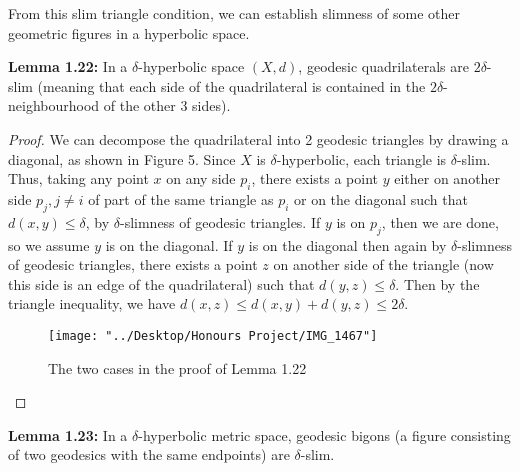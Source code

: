 \documentclass[12pt]{article}
\newcommand{\vs}{\vskip10pt}
\begin{document}
	\vs 
	
	From this slim triangle condition, we can establish slimness of some other geometric figures in a hyperbolic space.
	
	\vs 
	
	\textbf{Lemma 1.22: } In a $\delta$-hyperbolic space $(X,d)$, geodesic quadrilaterals are $2\delta$-slim (meaning that each side of the quadrilateral is contained in the $2 \delta$-neighbourhood of the other 3 sides). 
	
	\begin{proof}
		
		We can decompose the quadrilateral into 2 geodesic triangles by drawing a diagonal, as shown in Figure 5. Since $X$ is $\delta$-hyperbolic, each triangle is $\delta$-slim. Thus, taking any point $x$ on any side $p_i$, there exists a point $y$ either on another side $p_j, j \neq i$ of part of the same triangle as $p_i$ or on the diagonal such that $d(x,y) \leq \delta$, by $\delta$-slimness of geodesic triangles. If $y$ is on $p_j$, then we are done, so we assume $y$ is on the diagonal. If $y$ is on the diagonal then again by $\delta$-slimness of geodesic triangles, there exists a point $z$ on another side of the triangle (now this side is an edge of the quadrilateral) such that $d(y,z) \leq \delta$. Then by the triangle inequality, we have $d(x,z) \leq d(x,y) + d(y,z) \leq 2\delta$.
		
		\begin{figure} [H]
			\centering
			\texttt{[image: "../Desktop/Honours Project/IMG\_1467"]}
			\caption{The two cases in the proof of Lemma 1.22}
			\label{fig:img1467}
		\end{figure}
		
	\end{proof}
	
	\textbf{Lemma 1.23: } In a $\delta$-hyperbolic metric space, geodesic bigons (a figure consisting of two geodesics with the same endpoints) are $\delta$-slim. 
	
\end{document}
